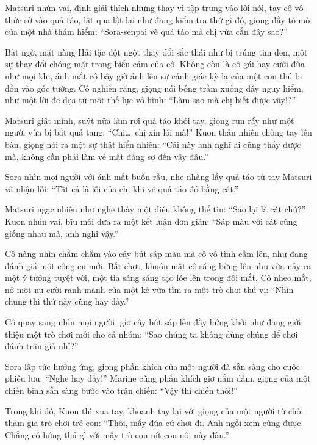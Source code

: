 \documentclass[../main.tex]{subfiles}
\begin{document}
Matsuri nhún vai, định giải thích nhưng thay vì tập trung vào lời nói, tay cô vô thức sờ vào quả táo, lật qua lật lại như đang kiểm tra thứ gì đó, giọng đầy tò mò của một nhà thám hiểm: ``Sora-senpai vẽ quả táo mà chị vừa cắn đây sao?''


Bất ngờ, mặt nàng Hải tặc đột ngột thay đổi sắc thái như bị trúng tim đen, một sự thay đổi chóng mặt trong biểu cảm của cô. Không còn là cô gái hay cười đùa như mọi khi, ánh mắt cô bây giờ ánh lên sự cảnh giác kỳ lạ của một con thú bị dồn vào góc tường. Cô nghiến răng, giọng nói bỗng trầm xuống đầy nguy hiểm, như một lời đe dọa từ một thế lực vô hình: ``Làm sao mà chị biết được vậy!?''

Matsuri giật mình, suýt nữa làm rơi quả táo khỏi tay, giọng run rẩy như một người vừa bị bắt quả tang: ``Chị\dots\ chị xin lỗi mà!'' Kuon thản nhiên chống tay lên bàn, giọng nói ra một sự thật hiển nhiên: ``Cái này anh nghĩ ai cũng thấy được mà, không cần phải làm vẻ mặt đáng sợ đến vậy đâu.''

Sora nhìn mọi người với ánh mắt buồn rầu, nhẹ nhàng lấy quả táo từ tay Matsuri và nhận lỗi: ``Tất cả là lỗi của chị khi vẽ quả táo đó bằng cát.''

Matsuri ngạc nhiên như nghe thấy một điều không thể tin: ``Sao lại là cát chứ?'' Kuon nhún vai, bĩu môi đưa ra một kết luận đơn giản: ``Sáp màu với cát cũng giống nhau mà, anh nghĩ vậy.''

Cô nàng nhìn chằm chằm vào cây bút sáp màu mà cô vô tình cầm lên, như đang đánh giá một công cụ mới. Bất chợt, khuôn mặt cô sáng bừng lên như vừa nảy ra một ý tưởng tuyệt vời, một tia sáng sáng tạo lóe lên trong đôi mắt. Cô nheo mắt, nở một nụ cười ranh mãnh của một kẻ vừa tìm ra một trò chơi thú vị: ``Nhìn chung thì thứ này cũng hay đấy.''

Cô quay sang nhìn mọi người, giơ cây bút sáp lên đầy hứng khởi như đang giới thiệu một trò chơi mới cho cả nhóm: ``Sao chúng ta không dùng chúng để chơi đánh trận giả nhỉ?''

Sora lập tức hưởng ứng, giọng phấn khích của một người đã sẵn sàng cho cuộc phiêu lưu: ``Nghe hay đấy!'' Marine cũng phấn khích giơ nắm đấm, giọng của một chiến binh sẵn sàng bước vào trận chiến: ``Vậy thì chiến thôi!''

Trong khi đó, Kuon thì xua tay, khoanh tay lại với giọng của một người từ chối tham gia trò chơi trẻ con: ``Thôi, mấy đứa cứ chơi đi. Anh ngồi xem cũng được. Chẳng có hứng thú gì với mấy trò con nít con nôi này đâu.''
\end{document}
